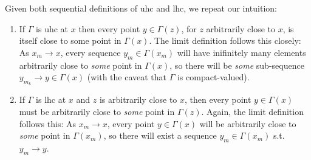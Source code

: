 \documentclass{article}
\begin{document}
Given both sequential definitions of uhc and lhc, we repeat our intuition:
\begin{enumerate}
  \item If $\Gamma$ is uhc at $x$ then every point $y \in \Gamma(z)$, for $z$ arbitrarily close to $x$, is itself close to some point in $\Gamma(x)$.  The limit definition follows this closely: As $x_m \to x$, every sequence $y_m \in \Gamma(x_m)$ will have inifinitely many elements arbitrarily close to \textit{some} point in $\Gamma(x)$, so there will be \textit{some} sub-sequence $y_{m_k} \to y \in \Gamma(x)$ (with the caveat that $\Gamma$ is compact-valued).

  \item If $\Gamma$ is lhc at $x$ and $z$ is arbitrarily close to $x$, then every point $y \in \Gamma(x)$ must be arbitrarily close to \textit{some} point in $\Gamma(z)$.  Again, the limit definition follows this: As $x_m \to x$, every point $y \in \Gamma(x)$ will be arbitrarily close to \textit{some} point in $\Gamma(x_m)$, so there will exist a sequence $y_m \in \Gamma(x_m)$ s.t. $y_m \to y$.
\end{enumerate}
\end{document}
